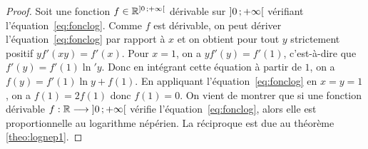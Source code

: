 \begin{proof}
    Soit une fonction \(f \in \mathbb{R}^{\left] 0 \, ;  +\infty \right[}\) dérivable sur 
    \(\left] 0 \, ;  +\infty \right[\) vérifiant l'équation~\eqref{eq:fonclog}. Comme \(f\) 
    est dérivable, on peut dériver l'équation~\eqref{eq:fonclog} par rapport 
    à \(x\) et on obtient pour tout \(y\) strictement positif 
    \(yf'(xy)=f'(x)\). Pour \(x=1\), on a \(yf'(y)=f'(1)\), c'est-à-dire que 
    \(f'(y)=f'(1) \ln' y\). Donc en intégrant cette équation à partir de 
    \(1\), on a \(f(y)=f'(1)\ln y + f(1)\). En appliquant 
    l'équation~\eqref{eq:fonclog} en \(x=y=1\), on a \(f(1)=2f(1)\) donc 
    \(f(1)=0\).
    On vient de montrer que si une fonction dérivable 
    \(f:\mathbb{R} \longrightarrow \left] 0 \, ;  +\infty \right[\) vérifie 
    l'équation~\eqref{eq:fonclog}, alors elle est proportionnelle au 
    logarithme népérien. La réciproque est due au 
    théorème~
\ref{theo:lognep1}.
\end{proof}
